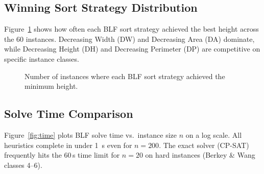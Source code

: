 \documentclass[11pt,a4paper]{article}
\begin{document}
\subsection{Winning Sort Strategy Distribution}

Figure~\ref{fig:sort_dist} shows how often each BLF sort strategy achieved
the best height across the 60 instances.
Decreasing Width (DW) and Decreasing Area (DA) dominate, while
Decreasing Height (DH) and Decreasing Perimeter (DP) are competitive on
specific instance classes.

\begin{figure}[h]
\centering
{}
\caption{Number of instances where each BLF sort strategy achieved the minimum height.}
\label{fig:sort_dist}
\end{figure}

\subsection{Solve Time Comparison}

Figure~\ref{fig:time} plots BLF solve time vs.\ instance size $n$ on a
log scale.
All heuristics complete in under 1~s even for $n=200$.
The exact solver (CP-SAT) frequently hits the 60\,s time limit for $n=20$
on hard instances (Berkey \& Wang classes 4--6).
\end{document}

